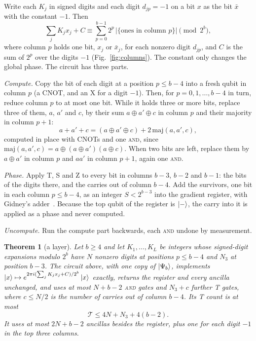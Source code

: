 \documentclass[aps,prx,twocolumn,superscriptaddress,nofootinbib,longbibliography]{revtex4-2}
\newtheorem{theorem}{Theorem}
\theoremstyle{remark}
\newcommand{\AND}{\textup{\textsc{and}}}
\newcommand{\Tc}{\mathcal{T}}
\begin{document}
Write each $K_j$ in signed digits and each digit $d_{jp}=-1$ on a bit $x$ as the bit $\bar x$
with the constant $-1$. Then
\begin{equation}\label{eq:columns}
  \sum_jK_jx_j+C\equiv\sum_{p=0}^{b-1}2^p\,\bigl|\{\text{ones in column }p\}\bigr|
  \pmod{2^b},
\end{equation}
where column $p$ holds one bit, $x_j$ or $\bar x_j$, for each nonzero digit $d_{jp}$, and $C$ is
the sum of $2^p$ over the digits $-1$ (Fig.~\ref{fig:columns}). The constant only changes the
global phase. The circuit has three parts.

\emph{Compute.} Copy the bit of each digit at a position $p\le b-4$ into a fresh qubit in
column $p$ (a CNOT, and an X for a digit $-1$). Then, for $p=0,1,\dots,b-4$ in turn, reduce
column $p$ to at most one bit. While it holds three or more bits, replace three of them, $a$,
$a'$ and $c$, by their sum $a\oplus a'\oplus c$ in column $p$ and their majority in column
$p+1$:
\begin{equation}
  a+a'+c=(a\oplus a'\oplus c)+2\,\mathrm{maj}(a,a',c),
\end{equation}
computed in place with CNOTs and one \AND{}, since
$\mathrm{maj}(a,a',c)=a\oplus(a\oplus a')(a\oplus c)$. When two bits are left, replace them by
$a\oplus a'$ in column $p$ and $aa'$ in column $p+1$, again one \AND{}.

\emph{Phase.} Apply T, S and Z to every bit in columns $b-3$, $b-2$ and $b-1$: the bits of the
digits there, and the carries out of column $b-4$. Add the survivors, one bit in each column
$p\le b-4$, as an integer $S<2^{b-3}$ into the gradient register, with Gidney's
adder~\cite{Gidney2018}. Because the top qubit of the register is $\ket-$, the carry into it is
applied as a phase and never computed.

\emph{Uncompute.} Run the compute part backwards, each \AND{} undone by measurement.

\begin{theorem}[a layer]\label{thm:layer}
Let $b\ge4$ and let $K_1,\dots,K_L$ be integers whose signed-digit expansions modulo $2^b$ have
$N$ nonzero digits at positions $p\le b-4$ and $N_3$ at position $b-3$. The circuit above,
with one copy of $\ket{\Psi_b}$, implements
$\ket{x}\mapsto e^{2\pi i(\sum_jK_jx_j+C)/2^b}\ket{x}$ exactly, returns the register and every
ancilla unchanged, and uses at most $N+b-2$ \AND{} gates and $N_3+c$ further T gates, where
$c\le N/2$ is the number of carries out of column $b-4$. Its T count is at most
\begin{equation}\label{eq:tcount}
  \Tc\le4N+N_3+4(b-2).
\end{equation}
It uses at most $2N+b-2$ ancillas besides the register, plus one for each digit $-1$ in the top
three columns.
\end{theorem}
\end{document}
